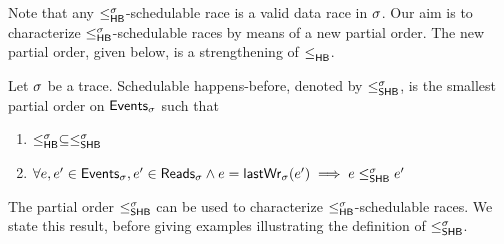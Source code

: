 Note that any $\leq^{\sigma}_{\mathsf{HB}}$-schedulable race is a valid data race in
$\sigma$. Our aim is to characterize $\leq^{\sigma}_{\mathsf{HB}}$-schedulable races by means
of a new partial order. 
The new partial order, given below, is a strengthening of $\leq^{}_{\mathsf{HB}}$.
%
\begin{definition}
\label{def:shb}
Let $\sigma$ be a trace. Schedulable happens-before, denoted by
$\leq^{\sigma}_{\mathsf{SHB}}$, is the smallest partial order on $\mathsf{Events}_{\sigma}$ such that
\begin{enumerate}[label=({\alph*})]
\item $\leq^{\sigma}_{\mathsf{HB}} \subseteq \leq^{\sigma}_{\mathsf{SHB}}$
\item $\forall e,e' \in \mathsf{Events}_{\sigma}, e' \in \mathsf{Reads}_{\sigma} \land 
  e = \mathsf{lastWr}_{\sigma}(e') \implies e \leq^{\sigma}_{\mathsf{SHB}} e'$
\end{enumerate}
\end{definition}
%
The partial order $\leq^{\sigma}_{\mathsf{SHB}}$ can be used to characterize
$\leq^{\sigma}_{\mathsf{HB}}$-schedulable races. We state this result, before giving
examples illustrating the definition of $\leq^{\sigma}_{\mathsf{SHB}}$.
%
